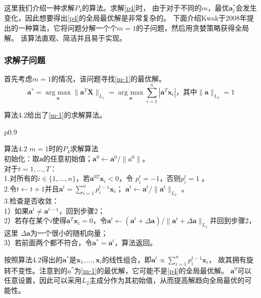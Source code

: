 这里我们介绍一种求解$P_4$的算法。求解\ref{p4}时，
由于对于不同的$m$，最优$\bm a_j^*$会发生变化，因此想要得出\ref{p4}的全局最优解是非常复杂的。
下面介绍Kwak于2008年提出的一种算法\cite{kwak2008principal}，它将问题分解一个个$m=1$的子问题，然后用贪婪策略获得全局解。
该算法直观、简洁并且易于实现。
\subsubsection{求解子问题}

首先考虑$m = 1$的情况，该问题寻找\eqref{m-1}的最优解。
\begin{equation}\label{m-1}
    \bm a^* = \underset{\bm a}{\operatorname{arg\ max}}\| \bm a ^T \bm{X}\|_{L_1}
    = \underset{\bm a}{\operatorname{arg\ max}}\sum_{i=1}^n|\bm a^T\bm x_i|
    \text{，其中}\|\bm a\|_{L_2} = 1
\end{equation}

算法4.2给出了\eqref{m-1}的求解算法。
\begin{table}[H]%
    \centering%
    \begin{tabular}{{p{0.9\columnwidth}}}%
    
    \toprule%
    算法4.2 $m=1$时的$P_4$求解算法\\
    \midrule%
        初始化：取$\bm a$的任意初始值；$\bm a^0\leftarrow \bm a^0/\|a^0\|$。 \\
        对于$t = 1, ..., T$：\\
            1.对所有的$i \in \{1, ..., n\}$，若$\bm a^{0T}\bm x_i < 0$，令
            $p_i^t = -1 $，否则$p_i^t = 1$ 。\\
            2.令$t \leftarrow t+1$并且$\bm a^t = \sum_{i=1}^np_i^{t-1}\bm x_i$；
            $\bm a^t \leftarrow \bm a^t/ \|\bm a^t\|_{L_2}$ 。\\
            3.检查是否收敛：\\
            1）如果$\bm a^t \neq \bm a^{t-1}$，回到步骤2；\\
            2）若存在某个$i$使得$\bm a^T\bm x_i = 0$，令$\bm a^t \leftarrow
            (\bm a^t + \Delta \bm a)/\|\bm a^t + \Delta \bm a\|_{L_2}$并回到步骤2，这里
            $\Delta \bm a$为一个很小的随机向量； \\
            3）若前面两个都不符合，令$\bm a^* = \bm a^t$，算法返回。\\
    \bottomrule%
    \end{tabular}
\end{table}%
按照算法4.2得出的$\bm a^*$是$\bm x_1, ..., \bm x_i$的线性组合，即$\bm a^t \propto \sum_{i=1}^np_i^{t-1}\bm x_i$，
故其拥有旋转不变性。注意到的$a^*$为\eqref{m-1}的最优解，它可能不是\eqref{p4}的全局最优解。
$\bm a^0$可以任意设置，因此可以采用$L_2$主成分作为其初始值，从而提高解趋向全局最优的可能性。

